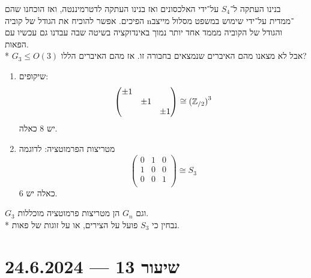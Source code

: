בנינו העתקה ל־$S_4$ על־ידי האלכסונים ואז בנינו העתקה לדטרמיננטה, ואז הוכחנו שהם הפיכים.
אפשר להוכיח את הגודל של קוביה n־ממדית על־ידי שימוש במשפט מסלול מייצב והגודל של הקוביה מממד אחד יותר נמוך באינדוקציה בשיטה שבה עבדנו גם עכשיו עם הפאות. \\*
$G_3 \le O(3)$ אבל לא מצאנו מהם האיברים שנמצאים בחבורה זו. אז מהם האיברים הללו?
\begin{enumerate}
	\item שיקופים:
		\[
			\begin{pmatrix}
				\pm 1 & & \\
				  & \pm 1 & \\
				  & & \pm 1 \\
			\end{pmatrix}
			\cong {(\mathbb{Z}_{/2})}^3
		\]
		יש 8 כאלה.
	\item מטריצות הפרמוטציה:
		לדוגמה
		\[
			\begin{pmatrix}
				0 & 1 & 0 \\
				1 & 0 & 0 \\
				0 & 0 & 1 \\
			\end{pmatrix}
			\cong S_3
		\]
		כאלה יש 6.
\end{enumerate}
$G_3$ וגם $G_n$ הן מטריצות פרמוטציה מוכללות. \\*
נבחין כי $S_3$ פועל על הצירים, או על זוגות של פאות.

\section{שיעור 13 --- 24.6.2024}
